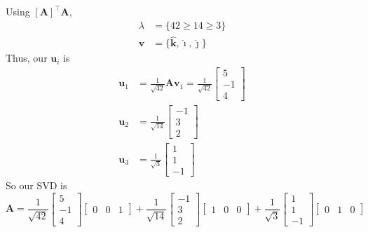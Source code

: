 \documentclass[]{article}
\renewcommand{\geq}{\geqslant}
\newcommand{\unit}[1]{\bm{\hat{#1}}}
\newcommand{\tpose}[1]{\left[#1\right]^{\! \top} \!\!}
\begin{document}
\subsection{}

Using \(\tpose{\bm{A}} \bm{A}\),
\begin{align}
	\lambda &= \{42 \geq 14 \geq 3\} \\
	\bm{v} &= \{\unit{k}, \unit{\imath}, \unit{\jmath}\}
\end{align}
Thus, our \(\bm{u}_i\) is
\begin{align}
	\bm{u}_1 &= \frac{1}{\sqrt{42}} \bm{A} \bm{v}_1 = \frac{1}{\sqrt{42}} \begin{bmatrix}
	5 \\
	-1 \\
	4
	\end{bmatrix} \\
	\bm{u}_2 &= \frac{1}{\sqrt{14}} \begin{bmatrix}
	-1 \\
	3 \\
	2
	\end{bmatrix} \\
	\bm{u}_3 &= \frac{1}{\sqrt{3}} \begin{bmatrix}
	1 \\
	1 \\
	-1
	\end{bmatrix}
\end{align}
So our SVD is
\begin{equation}
	\bm{A} = \frac{1}{\sqrt{42}} \begin{bmatrix}
	5 \\
	-1 \\
	4
	\end{bmatrix} \begin{bmatrix}
	0 & 0 & 1
	\end{bmatrix}
	+
	\frac{1}{\sqrt{14}} \begin{bmatrix}
	-1 \\
	3 \\
	2
	\end{bmatrix} \begin{bmatrix}
	1 & 0 & 0
	\end{bmatrix}
	+
	\frac{1}{\sqrt{3}} \begin{bmatrix}
	1 \\
	1 \\
	-1
	\end{bmatrix} \begin{bmatrix}
	0 & 1 & 0
	\end{bmatrix}
\end{equation}
\end{document}
